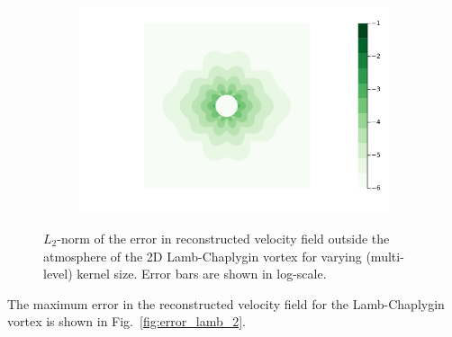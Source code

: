 \documentclass{article}
\begin{document}
\begin{figure}
\begin{subfigure}{.5\textwidth}
  \caption{}
\end{subfigure}%
\begin{subfigure}{.5\textwidth}
  \centering
  \includegraphics[width=\linewidth]{tex/fig/lamb_dipole_error_dist128.png}
  \caption{}
\end{subfigure}
\caption{$L_2$-norm of the error in reconstructed velocity field outside the atmosphere of the 2D Lamb-Chaplygin vortex for varying (multi-level) kernel size. Error bars are shown in log-scale.}
\label{fig:lam_error_dist}
\end{figure}

The maximum error in the reconstructed velocity field for the Lamb-Chaplygin vortex is shown in Fig.~\ref{fig:error_lamb_2}.
\end{document}

